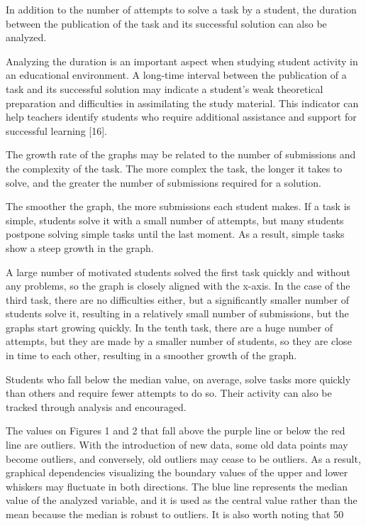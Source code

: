 \documentclass[letterpaper]{article}
\begin{document}
\begin{multicols}{2}
\begin{justify}
      In addition to the number of attempts to solve a task by a student, the duration between the publication of the task and its successful solution can also be analyzed.

      Analyzing the duration is an important aspect when studying student activity in an educational environment. A long-time interval between the publication of a task and its successful solution may indicate a student's weak theoretical preparation and difficulties in assimilating the study material. This indicator can help teachers identify students who require additional assistance and support for successful learning [16].

      The growth rate of the graphs may be related to the number of submissions and the complexity of the task. The more complex the task, the longer it takes to solve, and the greater the number of submissions required for a solution.

      The smoother the graph, the more submissions each student makes. If a task is simple, students solve it with a small number of attempts, but many students postpone solving simple tasks until the last moment. As a result, simple tasks show a steep growth in the graph.

      A large number of motivated students solved the first task quickly and without any problems, so the graph is closely aligned with the x-axis. In the case of the third task, there are no difficulties either, but a significantly smaller number of students solve it, resulting in a relatively small number of submissions, but the graphs start growing quickly. In the tenth task, there are a huge number of attempts, but they are made by a smaller number of students, so they are close in time to each other, resulting in a smoother growth of the graph.

      Students who fall below the median value, on average, solve tasks more quickly than others and require fewer attempts to do so. Their activity can also be tracked through analysis and encouraged.

      The values on Figures 1 and 2 that fall above the purple line or below the red line are outliers. With the introduction of new data, some old data points may become outliers, and conversely, old outliers may cease to be outliers. As a result, graphical dependencies visualizing the boundary values of the upper and lower whiskers may fluctuate in both directions. The blue line represents the median value of the analyzed variable, and it is used as the central value rather than the mean because the median is robust to outliers. It is also worth noting that 50%


\end{justify}
\end{multicols}
\end{document}
